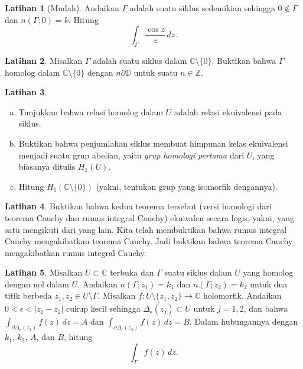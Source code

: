 \documentclass[12pt,openany]{book}
\newcommand{\sabs}[1]{\lvert {#1} \rvert}
\newcommand{\C}{{\mathbb{C}}}
\newcommand{\Z}{{\mathbb{Z}}}
\newcommand{\D}{{\mathbb{D}}}
\newcommand{\myindex}[1]{#1\index{#1}}
\theoremstyle{plain}
\theoremstyle{remark}
\theoremstyle{definition}
\newenvironment{exbox}{%
    \def\FrameCommand{\vrule width 1pt \relax\hspace{10pt}}%
    \MakeFramed{\advance\hsize-\width\FrameRestore}%
}{%
    \endMakeFramed
}
\newenvironment{exparts}{%
    \leavevmode\begin{enumerate}[a),noitemsep,topsep=0pt,parsep=0pt,partopsep=0pt]
}{%
    \end{enumerate}
}
\theoremstyle{exercise}
\newtheorem{exercise}{Latihan}[section]
\theoremstyle{example}
\begin{document}
\begin{exbox}
\begin{exercise}[Mudah]
Andaikan $\Gamma$ adalah suatu siklus sedemikian sehingga
$0 \notin \Gamma$ dan
$n(\Gamma;0) = k$.  Hitung
\begin{equation*}
\int_{\Gamma} \frac{\cos z}{z} \, dz .
\end{equation*}
\end{exercise}

\begin{exercise}
Misalkan $\Gamma$ adalah
suatu siklus dalam $\C \setminus \{ 0 \}$.
Buktikan bahwa $\Gamma$ homolog dalam $\C \setminus \{ 0 \}$
dengan $n \partial \D$ untuk suatu $n \in \Z$.
\end{exercise}

\begin{exercise} \label{exercise:H1U}
\begin{exparts}
\item
Tunjukkan bahwa relasi homolog dalam $U$ adalah relasi ekuivalensi pada siklus.
\item
Buktikan bahwa penjumlahan siklus membuat himpunan kelas ekuivalensi
menjadi suatu grup abelian, yaitu
\emph{\myindex{grup homologi pertama}} dari $U$,
yang biasanya ditulis $H_1(U)$.
\item
Hitung $H_1(\C \setminus \{ 0 \})$ (yakni,
tentukan grup yang isomorfik dengannya).
\end{exparts}
\end{exercise}

\begin{exercise}
Buktikan bahwa kedua teorema tersebut
(versi homologi dari teorema Cauchy dan rumus integral Cauchy)
ekuivalen secara logis, yakni, yang satu mengikuti
dari yang lain.  Kita telah membuktikan bahwa rumus integral Cauchy
mengakibatkan teorema Cauchy.  Jadi buktikan bahwa
teorema Cauchy mengakibatkan rumus integral Cauchy.
\end{exercise}

\begin{exercise}
Misalkan $U \subset \C$ terbuka dan $\Gamma$ suatu siklus dalam $U$
yang homolog dengan nol dalam $U$.
Andaikan $n(\Gamma;z_1) = k_1$ dan $n(\Gamma;z_2) = k_2$ untuk
dua titik berbeda $z_1,z_2 \in U \setminus \Gamma$.
Misalkan $f \colon U \setminus \{z_1,z_2\} \to \C$
holomorfik.
Andaikan $0< \epsilon < \sabs{z_1-z_2}$ cukup kecil sehingga
$\overline{\Delta_\epsilon(z_j)} \subset U$ untuk $j=1,2$,
dan bahwa
$\int_{\partial \Delta_\epsilon(z_1)} f(z) \, dz = A$ dan 
$\int_{\partial \Delta_\epsilon(z_2)} f(z) \, dz = B$.
Dalam hubungannya dengan $k_1$, $k_2$, $A$, dan $B$,
hitung
\begin{equation*}
\int_{\Gamma} f(z) \, dz .
\end{equation*}
\end{exercise}
\end{exbox}
\end{document}
